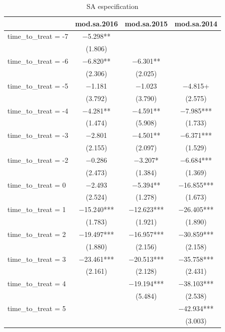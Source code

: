\documentclass[
]{article}
\begin{document}
\begin{table}

\caption{\label{tab:table-4}SA especification}
\centering
\begin{tabular}[t]{lccc}
\toprule
  & mod.sa.2016 & mod.sa.2015 & mod.sa.2014\\
\midrule
time\_to\_treat = -7 & \num{-5.298}** &  & \\
 & (\num{1.806}) &  & \\
time\_to\_treat = -6 & \num{-6.820}** & \num{-6.301}** & \\
 & (\num{2.306}) & (\num{2.025}) & \\
time\_to\_treat = -5 & \num{-1.181} & \num{-1.023} & \num{-4.815}+\\
 & (\num{3.792}) & (\num{3.790}) & (\num{2.575})\\
time\_to\_treat = -4 & \num{-4.281}** & \num{-4.591}** & \num{-7.985}***\\
 & (\num{1.474}) & (\num{5.908}) & (\num{1.733})\\
time\_to\_treat = -3 & \num{-2.801} & \num{-4.501}** & \num{-6.371}***\\
 & (\num{2.155}) & (\num{2.097}) & (\num{1.529})\\
time\_to\_treat = -2 & \num{-0.286} & \num{-3.207}* & \num{-6.684}***\\
 & (\num{2.473}) & (\num{1.384}) & (\num{1.369})\\
time\_to\_treat = 0 & \num{-2.493} & \num{-5.394}** & \num{-16.855}***\\
 & (\num{2.524}) & (\num{1.278}) & (\num{1.673})\\
time\_to\_treat = 1 & \num{-15.240}*** & \num{-12.623}*** & \num{-26.405}***\\
 & (\num{1.783}) & (\num{1.921}) & (\num{1.890})\\
time\_to\_treat = 2 & \num{-19.497}*** & \num{-16.957}*** & \num{-30.859}***\\
 & (\num{1.880}) & (\num{2.156}) & (\num{2.158})\\
time\_to\_treat = 3 & \num{-23.461}*** & \num{-20.513}*** & \num{-35.758}***\\
 & (\num{2.161}) & (\num{2.128}) & (\num{2.431})\\
time\_to\_treat = 4 &  & \num{-19.194}*** & \num{-38.103}***\\
 &  & (\num{5.484}) & (\num{2.538})\\
time\_to\_treat = 5 &  &  & \num{-42.934}***\\
 &  &  & (\num{3.003})\\

\end{tabular}
\end{table}
\end{document}
